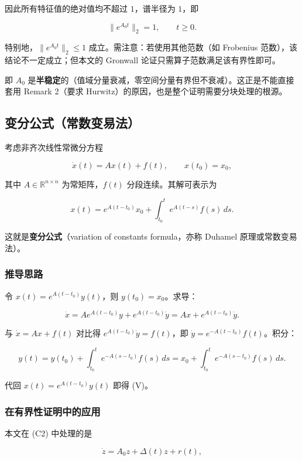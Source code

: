 \documentclass[UTF8,fontset=fandol]{ctexart}
\newcommand{\R}{\mathbb{R}}
\begin{document}
因此所有特征值的绝对值均不超过 $1$，谱半径为 $1$，即

\[
\|e^{A_0 t}\|_2 = 1, \qquad t \geq 0.
\]

特别地，$\|e^{A_0 t}\|_2 \leq 1$ 成立。需注意：若使用其他范数（如 Frobenius 范数），该结论不一定成立；但本文的 Gronwall 论证只需算子范数满足该有界性即可。

即 $A_0$ 是\textbf{半稳定}的（值域分量衰减，零空间分量有界但不衰减）。这正是不能直接套用 Remark 2（要求 Hurwitz）的原因，也是整个证明需要分块处理的根源。

\subsection{变分公式（常数变易法）}

考虑非齐次线性常微分方程

\[
\dot{x}(t) = A x(t) + f(t), \qquad x(t_0) = x_0,
\]

其中 $A \in \R^{n\times n}$ 为常矩阵，$f(t)$ 分段连续。其解可表示为

\begin{equation}
x(t) = e^{A(t-t_0)} x_0 + \int_{t_0}^{t} e^{A(t-s)} f(s)\,ds.
\tag{V}
\end{equation}

这就是\textbf{变分公式}（variation of constants formula，亦称 Duhamel 原理或常数变易法）。

\subsubsection*{推导思路}

令 $x(t) = e^{A(t-t_0)} y(t)$，则 $y(t_0) = x_0$。求导：

\[
\dot{x} = A e^{A(t-t_0)} y + e^{A(t-t_0)} \dot{y}
= A x + e^{A(t-t_0)} \dot{y}.
\]

与 $\dot{x} = Ax + f(t)$ 对比得 $e^{A(t-t_0)} \dot{y} = f(t)$，即 $\dot{y} = e^{-A(t-t_0)} f(t)$。积分：

\[
y(t) = y(t_0) + \int_{t_0}^{t} e^{-A(s-t_0)} f(s)\,ds
= x_0 + \int_{t_0}^{t} e^{-A(s-t_0)} f(s)\,ds.
\]

代回 $x(t) = e^{A(t-t_0)} y(t)$ 即得 (V)。

\subsubsection*{在有界性证明中的应用}

本文在 (C2) 中处理的是

\[
\dot{z} = A_0 z + \Delta(t) z + r(t),
\]
\end{document}
